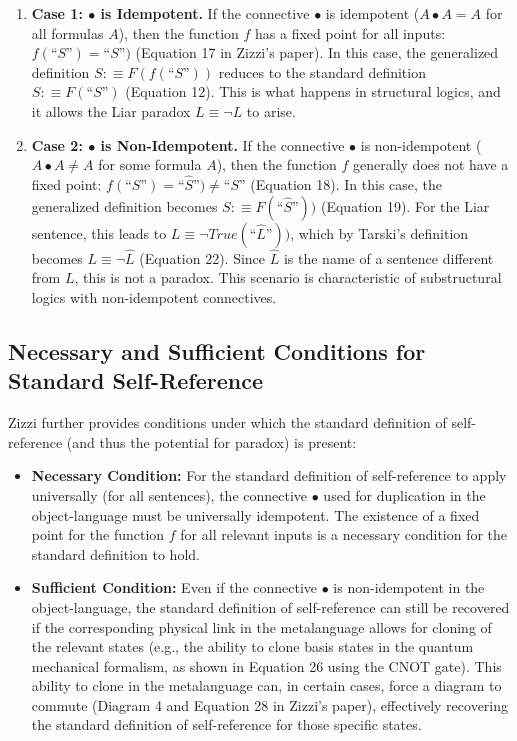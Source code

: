 	\begin{enumerate}
		\item \textbf{Case 1: \(\bullet\) is Idempotent.} If the connective \(\bullet\) is idempotent (\(A \bullet A = A\) for all formulas \(A\)), then the function \(f\) has a fixed point for all inputs: \(f(\text{``}S\text{''}) = \text{``}S\text{''})\) (Equation 17 in Zizzi's paper). In this case, the generalized definition \(S :\equiv F(f(\text{``}S\text{''}))\) reduces to the standard definition \(S :\equiv F(\text{``}S\text{''})\) (Equation 12). This is what happens in structural logics, and it allows the Liar paradox \(L \equiv \neg L\) to arise.
		
		\item \textbf{Case 2: \(\bullet\) is Non-Idempotent.} If the connective \(\bullet\) is non-idempotent (\(A \bullet A \neq A\) for some formula \(A\)), then the function \(f\) generally does not have a fixed point: \(f(\text{``}S\text{''}) = \text{``}\widehat{S}\text{''}) \neq \text{``}S\text{''}\) (Equation 18). In this case, the generalized definition becomes \(S :\equiv F(\text{``}\widehat{S}\text{''}))\) (Equation 19). For the Liar sentence, this leads to \(L \equiv \neg True(\text{``}\widehat{L}\text{''}))\), which by Tarski's definition becomes \(L \equiv \neg \widehat{L}\) (Equation 22). Since \(\widehat{L}\) is the name of a sentence different from \(L\), this is not a paradox. This scenario is characteristic of substructural logics with non-idempotent connectives.
	\end{enumerate}
	
	\subsection{Necessary and Sufficient Conditions for Standard Self-Reference}
	
	Zizzi further provides conditions under which the standard definition of self-reference (and thus the potential for paradox) is present:
	
	\begin{itemize}
		\item \textbf{Necessary Condition:} For the standard definition of self-reference to apply universally (for all sentences), the connective \(\bullet\) used for duplication in the object-language must be universally idempotent. The existence of a fixed point for the function \(f\) for all relevant inputs is a necessary condition for the standard definition to hold.
		
		\item \textbf{Sufficient Condition:} Even if the connective \(\bullet\) is non-idempotent in the object-language, the standard definition of self-reference can still be recovered if the corresponding physical link in the metalanguage allows for cloning of the relevant states (e.g., the ability to clone basis states in the quantum mechanical formalism, as shown in Equation 26 using the CNOT gate). This ability to clone in the metalanguage can, in certain cases, force a diagram to commute (Diagram 4 and Equation 28 in Zizzi's paper), effectively recovering the standard definition of self-reference for those specific states.
	\end{itemize}
	
